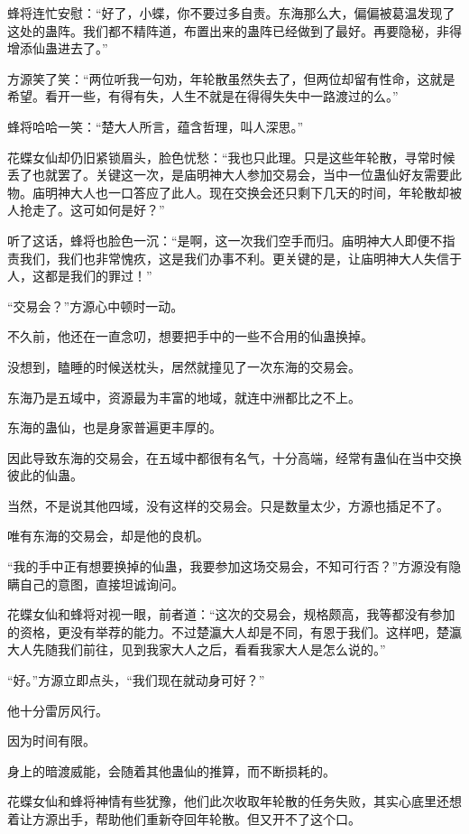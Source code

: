 \begin{this_body}
蜂将连忙安慰：“好了，小蝶，你不要过多自责。东海那么大，偏偏被葛温发现了这处的蛊阵。我们都不精阵道，布置出来的蛊阵已经做到了最好。再要隐秘，非得增添仙蛊进去了。”

方源笑了笑：“两位听我一句劝，年轮散虽然失去了，但两位却留有性命，这就是希望。看开一些，有得有失，人生不就是在得得失失中一路渡过的么。”

蜂将哈哈一笑：“楚大人所言，蕴含哲理，叫人深思。”

花蝶女仙却仍旧紧锁眉头，脸色忧愁：“我也只此理。只是这些年轮散，寻常时候丢了也就罢了。关键这一次，是庙明神大人参加交易会，当中一位蛊仙好友需要此物。庙明神大人也一口答应了此人。现在交换会还只剩下几天的时间，年轮散却被人抢走了。这可如何是好？”

听了这话，蜂将也脸色一沉：“是啊，这一次我们空手而归。庙明神大人即便不指责我们，我们也非常愧疚，这是我们办事不利。更关键的是，让庙明神大人失信于人，这都是我们的罪过！”

“交易会？”方源心中顿时一动。

不久前，他还在一直念叨，想要把手中的一些不合用的仙蛊换掉。

没想到，瞌睡的时候送枕头，居然就撞见了一次东海的交易会。

东海乃是五域中，资源最为丰富的地域，就连中洲都比之不上。

东海的蛊仙，也是身家普遍更丰厚的。

因此导致东海的交易会，在五域中都很有名气，十分高端，经常有蛊仙在当中交换彼此的仙蛊。

当然，不是说其他四域，没有这样的交易会。只是数量太少，方源也插足不了。

唯有东海的交易会，却是他的良机。

“我的手中正有想要换掉的仙蛊，我要参加这场交易会，不知可行否？”方源没有隐瞒自己的意图，直接坦诚询问。

花蝶女仙和蜂将对视一眼，前者道：“这次的交易会，规格颇高，我等都没有参加的资格，更没有举荐的能力。不过楚瀛大人却是不同，有恩于我们。这样吧，楚瀛大人先随我们前往，见到我家大人之后，看看我家大人是怎么说的。”

“好。”方源立即点头，“我们现在就动身可好？”

他十分雷厉风行。

因为时间有限。

身上的暗渡威能，会随着其他蛊仙的推算，而不断损耗的。

花蝶女仙和蜂将神情有些犹豫，他们此次收取年轮散的任务失败，其实心底里还想着让方源出手，帮助他们重新夺回年轮散。但又开不了这个口。


\end{this_body}
